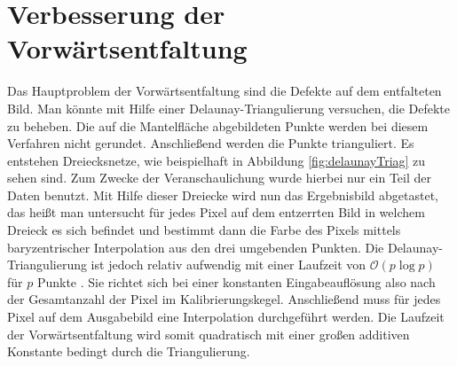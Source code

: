 \section{Verbesserung der Vorwärtsentfaltung}
Das Hauptproblem der Vorwärtsentfaltung sind die Defekte auf dem entfalteten Bild. Man könnte mit Hilfe einer Delaunay-Triangulierung versuchen, die Defekte zu beheben. 
Die auf die Mantelfläche abgebildeten Punkte werden bei diesem Verfahren nicht gerundet. Anschließend werden die Punkte trianguliert. Es entstehen Dreiecksnetze, wie beispielhaft in Abbildung \ref{fig:delaunayTriag} zu sehen sind. Zum Zwecke der Veranschaulichung wurde hierbei nur ein Teil der Daten benutzt. Mit Hilfe dieser Dreiecke wird nun das Ergebnisbild abgetastet, das heißt man untersucht für jedes Pixel auf dem entzerrten Bild in welchem Dreieck es sich befindet und bestimmt dann die Farbe des Pixels mittels baryzentrischer  Interpolation aus den drei umgebenden Punkten. Die Delaunay-Triangulierung ist jedoch relativ aufwendig mit einer Laufzeit von $\mathcal{O}(p\log p)$ für $p$ Punkte \cite{Su1997}. Sie richtet sich bei einer konstanten Eingabeauflösung also nach der Gesamtanzahl der Pixel im Kalibrierungskegel. Anschließend muss für jedes Pixel auf dem Ausgabebild eine Interpolation durchgeführt werden. Die Laufzeit der Vorwärtsentfaltung wird somit quadratisch mit einer großen additiven Konstante bedingt durch die Triangulierung.


